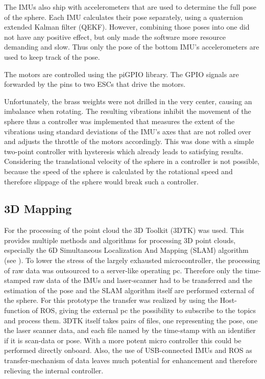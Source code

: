 The IMUs also ship with accelerometers that are used to determine the full pose of the sphere. Each IMU calculates their pose separately, using a quaternion extended Kalman filter (QEKF). However, combining those poses into one did not have any positive effect, but only made the software more resource demanding and slow. Thus only the pose of the bottom IMU's accelerometers are used to keep track of the pose.

The motors are controlled using the piGPIO library. The GPIO signals are forwarded by the pins to two ESCs that drive the motors. 

Unfortunately, the brass weights were not drilled in the very center, causing an imbalance when rotating. The resulting vibrations inhibit the movement of the sphere thus a controller was implemented that measures the extent of the vibrations using standard deviations of the IMU's axes that are not rolled over and adjusts the throttle of the motors accordingly. This was done with a simple two-point controller with hysteresis which already leads to satisfying results. Considering the translational velocity of the sphere in a controller is not possible, because the speed of the sphere is calculated by the rotational speed and therefore slippage of the sphere would break such a controller. 

\subsection{3D Mapping}                                                                                                                                                                                  
\label{sec:TechnicalApproach:3dMapping}
For the processing of the point cloud the 3D Toolkit (3DTK) was used. This provides multiple methods and algorithms for processing 3D point clouds, especially the 6D Simultaneous Localization And Mapping (SLAM) algorithm (see \cite{JFR2006}). To lower the stress of the largely exhausted microcontroller, the processing of raw data was outsourced to a server-like operating pc. Therefore only the time-stamped raw data of the IMUs and laser-scanner had to be transferred and the estimation of the pose and the SLAM algorithm itself are performed external of the sphere. For this prototype the transfer was realized by using the Host-function of ROS, giving the external pc the possibility to subscribe to the topics and process them. 3DTK itself takes pairs of files, one representing the pose, one the laser scanner data, and each file named by the time-stamp with an identifier if it is scan-data or pose. With a more potent micro controller this could be performed directly onboard. Also, the use of USB-connected IMUs and ROS as transfer-mechanism of data leaves much potential for enhancement and therefore relieving the internal controller.
